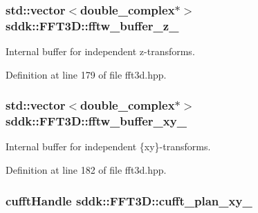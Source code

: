 \subsubsection[{fftw\+\_\+buffer\+\_\+z\+\_\+}]{\setlength{\rightskip}{0pt plus 5cm}std\+::vector$<$double\+\_\+complex$\ast$$>$ sddk\+::\+F\+F\+T3\+D\+::fftw\+\_\+buffer\+\_\+z\+\_\+\hspace{0.3cm}{\ttfamily [protected]}}\label{classsddk_1_1_f_f_t3_d_a9f1235d01cc4e2e2f0f4dd2af50644bb}


Internal buffer for independent z-\/transforms. 



Definition at line 179 of file fft3d.\+hpp.

\hypertarget{classsddk_1_1_f_f_t3_d_abd9baeb5d472ee92e8f08f95587a257a}{}
\subsubsection[{fftw\+\_\+buffer\+\_\+xy\+\_\+}]{\setlength{\rightskip}{0pt plus 5cm}std\+::vector$<$double\+\_\+complex$\ast$$>$ sddk\+::\+F\+F\+T3\+D\+::fftw\+\_\+buffer\+\_\+xy\+\_\+\hspace{0.3cm}{\ttfamily [protected]}}\label{classsddk_1_1_f_f_t3_d_abd9baeb5d472ee92e8f08f95587a257a}


Internal buffer for independent \{xy\}-\/transforms. 



Definition at line 182 of file fft3d.\+hpp.

\hypertarget{classsddk_1_1_f_f_t3_d_a7819df1c1ea576622c94a078bf34bdbf}{}
\subsubsection[{cufft\+\_\+plan\+\_\+xy\+\_\+}]{\setlength{\rightskip}{0pt plus 5cm}cufft\+Handle sddk\+::\+F\+F\+T3\+D\+::cufft\+\_\+plan\+\_\+xy\+\_\+\hspace{0.3cm}{\ttfamily [protected]}}\label{classsddk_1_1_f_f_t3_d_a7819df1c1ea576622c94a078bf34bdbf}


